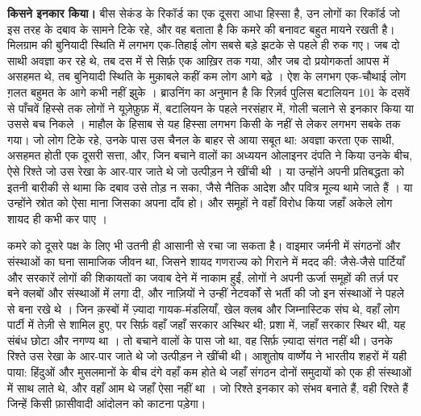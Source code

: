 \textbf{किसने इनकार किया।} बीस सेकंड के रिकॉर्ड का एक दूसरा आधा हिस्सा है, उन लोगों का रिकॉर्ड जो इस तरह के दबाव के सामने टिके रहे, और वह बताता है कि कमरे की बनावट बहुत मायने रखती है। मिलग्राम की बुनियादी स्थिति में लगभग एक-तिहाई लोग सबसे बड़े झटके से पहले ही रुक गए। जब दो साथी अवज्ञा कर रहे थे, तब दस में से सिर्फ़ एक आख़िर तक गया, और जब दो प्रयोगकर्ता आपस में असहमत थे, तब बुनियादी स्थिति के मुक़ाबले कहीं कम लोग आगे बढ़े \autocite{milgram1974obedience}। ऐश के लगभग एक-चौथाई लोग ग़लत बहुमत के आगे कभी नहीं झुके \autocite{asch1956studies}। ब्राउनिंग का अनुमान है कि रिज़र्व पुलिस बटालियन 101 के दसवें से पाँचवें हिस्से तक लोगों ने यूज़ेफ़ुफ़ में, बटालियन के पहले नरसंहार में, गोली चलाने से इनकार किया या उससे बच निकले \autocite{browning1992ordinary}। माहौल के हिसाब से यह हिस्सा लगभग किसी के नहीं से लेकर लगभग सबके तक गया। जो लोग टिके रहे, उनके पास उस चैनल के बाहर से आया सबूत था: अवज्ञा करता एक साथी, असहमत होती एक दूसरी सत्ता, और, जिन बचाने वालों का अध्ययन ओलाइनर दंपति ने किया उनके बीच, ऐसे रिश्ते जो उस रेखा के आर-पार जाते थे जो उत्पीड़न ने खींची थी \autocite{oliner1988altruistic}। या उन्होंने अपनी प्रतिबद्धता को इतनी बारीकी से थामा कि दबाव उसे तोड़ न सका, जैसे नैतिक आदेश और पवित्र मूल्य थामे जाते हैं \autocite{skitka2009limits,ginges2007sacred}। या उन्होंने स्रोत को ऐसा माना जिसका अपना दाँव हो। और समूहों ने वहाँ विरोध किया जहाँ अकेले लोग शायद ही कभी कर पाए \autocite{gamson1982encounters}।

कमरे को दूसरे पक्ष के लिए भी उतनी ही आसानी से रचा जा सकता है। वाइमार जर्मनी में संगठनों और संस्थाओं का घना सामाजिक जीवन था, जिसने शायद गणराज्य को गिराने में मदद की: जैसे-जैसे पार्टियाँ और सरकारें लोगों की शिकायतों का जवाब देने में नाकाम हुईं, लोगों ने अपनी ऊर्जा समूहों की तर्ज़ पर बने क्लबों और संस्थाओं में लगा दी, और नाज़ियों ने उन्हीं नेटवर्कों से भर्ती की जो इन संस्थाओं ने पहले से बना रखे थे \autocite{berman1997weimar}। जिन क़स्बों में ज़्यादा गायक-मंडलियाँ, खेल क्लब और जिम्नास्टिक संघ थे, वहाँ लोग पार्टी में तेज़ी से शामिल हुए, पर सिर्फ़ वहाँ जहाँ सरकार अस्थिर थी; प्रशा में, जहाँ सरकार स्थिर थी, यह संबंध छोटा और नगण्य था \autocite{satyanath2017bowling}। तो बचाने वालों के पास जो था, वह सिर्फ़ ज़्यादा संगत नहीं थी। उनके रिश्ते उस रेखा के आर-पार जाते थे जो उत्पीड़न ने खींची थी। आशुतोष वार्ष्णेय ने भारतीय शहरों में यही पाया: हिंदुओं और मुसलमानों के बीच दंगे वहाँ कम होते थे जहाँ संगठन दोनों समुदायों को एक ही संस्थाओं में साथ लाते थे, और वहाँ आम थे जहाँ ऐसा नहीं था \autocite{varshney2002ethnic}। जो रिश्ते इनकार को संभव बनाते हैं, वही रिश्ते हैं जिन्हें किसी फ़ासीवादी आंदोलन को काटना पड़ेगा।

